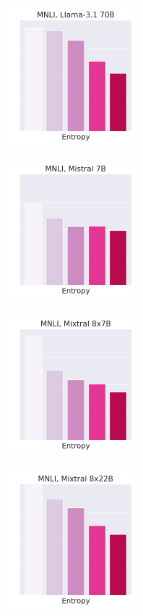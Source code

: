 \begin{figure}[t]
\begin{subfigure}[b]{0.23\textwidth}
    \end{subfigure}\\
    \begin{subfigure}[b]{0.23\textwidth}
        \includegraphics[height=3.6cm]{figures/appendix/entropy_acc_mnli_matched_70B}
    \end{subfigure}
    \begin{subfigure}[b]{0.23\textwidth}
        \includegraphics[height=3.6cm]{figures/appendix/entropy_acc_mnli_matched_7B}
    \end{subfigure}
    \begin{subfigure}[b]{0.23\textwidth}
        \includegraphics[height=3.6cm]{figures/appendix/entropy_acc_mnli_matched_8x7B}
    \end{subfigure}
    \begin{subfigure}[b]{0.23\textwidth}
        \includegraphics[height=3.6cm]{figures/appendix/entropy_acc_mnli_matched_8x22B}

\end{subfigure}
\end{figure}
